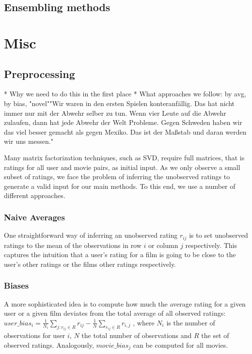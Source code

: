 \documentclass[10pt,conference,compsocconf]{IEEEtran}
\begin{document}
\subsection{Ensembling methods}


\section{Misc}

\subsection{Preprocessing}

* Why we need to do this in the first place
* What approaches we follow:
    by avg, by bias, "novel""Wir waren in den ersten Spielen konteranfällig. Das hat nicht immer nur mit der Abwehr selber zu tun. Wenn vier Leute auf die Abwehr zulaufen, dann hat jede Abwehr der Welt Probleme. Gegen Schweden haben wir das viel besser gemacht als gegen Mexiko. Das ist der Maßstab und daran werden wir uns messen." 
    
Many matrix factorization techniques, such as SVD, require full matrices, that is ratings for all user and movie pairs, as initial input. As we only observe a small subset of ratings, we face the problem of inferring the unobserved ratings to generate a valid input for our main methods. To this end, we use a number of different approaches.

\subsubsection{Naive Averages}
One straightforward way of inferring an unobserved rating $r_{ij}$ is to set unobserved ratings to the mean of the observations in row $i$ or column $j$ respectively. This captures the intuition that a user's rating for a film is going to be close to the user's other ratings or the films other ratings respectively.

\subsubsection{Biases}
A more sophisticated idea is to compute how much the average rating for a given user or a given film deviates from the total average of all observed ratings: $user\_bias_i = \frac{1}{N_i} \sum_{j : r_{ij} \in R} r_{ij} - \frac{1}{N} \sum_{r_{ij} \in R} r_{i,j}$ , where $N_i$ is the number of observations for user $i$, $N$ the total number of observations and $R$ the set of observed ratings. Analogously, $movie\_bias_j$ can be computed for all movies. 
\end{document}
